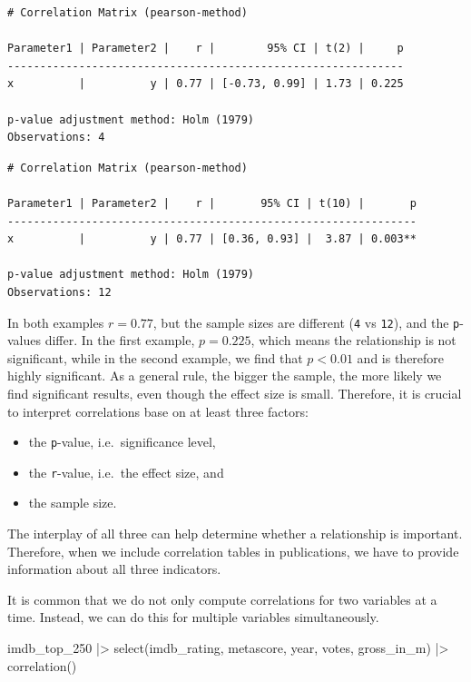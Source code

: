 \documentclass[
  letterpaper,
]{krantz}
\makeatletter
\newenvironment{Shaded}{\begin{snugshade}}{\end{snugshade}}
\newcommand{\FunctionTok}[1]{\textcolor[rgb]{0.28,0.35,0.67}{#1}}
\newcommand{\NormalTok}[1]{\textcolor[rgb]{0.00,0.23,0.31}{#1}}
\newcommand{\SpecialCharTok}[1]{\textcolor[rgb]{0.37,0.37,0.37}{#1}}
\newenvironment{kframe}{%
\medskip{}
\setlength{\fboxsep}{.8em}
 \def\at@end@of@kframe{}%
 \ifinner\ifhmode%
  \def\at@end@of@kframe{\end{minipage}}%
  \begin{minipage}{\columnwidth}%
 \fi\fi%
 \def\FrameCommand##1{\hskip\@totalleftmargin \hskip-\fboxsep
 \colorbox{shadecolor}{##1}\hskip-\fboxsep
     \hskip-\linewidth \hskip-\@totalleftmargin \hskip\columnwidth}%
 \MakeFramed {\advance\hsize-\width
   \@totalleftmargin\z@ \linewidth\hsize
   \@setminipage}}%
 {\par\unskip\endMakeFramed%
 \at@end@of@kframe}
\renewenvironment{Shaded}{\begin{kframe}}{\end{kframe}}
\makeatother
\begin{document}
\begin{verbatim}
# Correlation Matrix (pearson-method)

Parameter1 | Parameter2 |    r |        95% CI | t(2) |     p
-------------------------------------------------------------
x          |          y | 0.77 | [-0.73, 0.99] | 1.73 | 0.225

p-value adjustment method: Holm (1979)
Observations: 4
\end{verbatim}

\begin{verbatim}
# Correlation Matrix (pearson-method)

Parameter1 | Parameter2 |    r |       95% CI | t(10) |       p
---------------------------------------------------------------
x          |          y | 0.77 | [0.36, 0.93] |  3.87 | 0.003**

p-value adjustment method: Holm (1979)
Observations: 12
\end{verbatim}

In both examples \(r = 0.77\), but the sample sizes are different
(\texttt{4} vs \texttt{12}), and the \texttt{p}-values differ. In the
first example, \(p = 0.225\), which means the relationship is not
significant, while in the second example, we find that \(p < 0.01\) and
is therefore highly significant. As a general rule, the bigger the
sample, the more likely we find significant results, even though the
effect size is small. Therefore, it is crucial to interpret correlations
base on at least three factors:

\begin{itemize}
\item
  the \texttt{p}-value, i.e.~significance level,
\item
  the \texttt{r}-value, i.e.~the effect size, and
\item
  the sample size.
\end{itemize}

The interplay of all three can help determine whether a relationship is
important. Therefore, when we include correlation tables in
publications, we have to provide information about all three indicators.

It is common that we do not only compute correlations for two variables
at a time. Instead, we can do this for multiple variables
simultaneously.

\begin{Shaded}
\begin{Highlighting}[]
\NormalTok{imdb\_top\_250 }\SpecialCharTok{|\textgreater{}}
  \FunctionTok{select}\NormalTok{(imdb\_rating, metascore, year, votes, gross\_in\_m) }\SpecialCharTok{|\textgreater{}}
  \FunctionTok{correlation}\NormalTok{()}
\end{Highlighting}
\end{Shaded}
\end{document}
